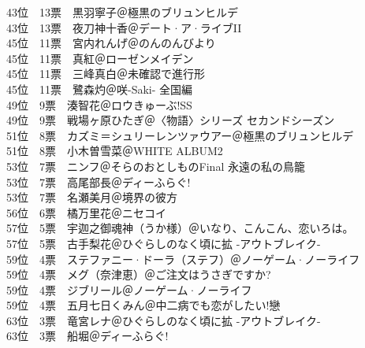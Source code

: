 {    43位　13票　黒羽寧子＠極黒のブリュンヒルデ                              \\
    43位　13票　夜刀神十香＠デート·ア·ライブII                            \\
    45位　11票　宮内れんげ＠のんのんびより                                  \\
    45位　11票　真紅＠ローゼンメイデン                                      \\
    45位　11票　三峰真白＠未確認で進行形                                    \\
    45位　11票　鷺森灼＠咲-Saki- 全国編                                     \\
    49位　9票　湊智花＠ロウきゅーぶ!SS                                      \\
    49位　9票　戦場ヶ原ひたぎ＠〈物語〉シリーズ セカンドシーズン            \\
    51位　8票　カズミ＝シュリーレンツァウアー＠極黒のブリュンヒルデ         \\
    51位　8票　小木曽雪菜＠WHITE ALBUM2                                     \\
    53位　7票　ニンフ＠そらのおとしものFinal 永遠の私の鳥籠                 \\
    53位　7票　高尾部長＠ディーふらぐ!                                      \\
    53位　7票　名瀬美月＠境界の彼方                                         \\
    56位　6票　橘万里花＠ニセコイ                                           \\
    57位　5票　宇迦之御魂神（うか様）＠いなり、こんこん、恋いろは。         \\
    57位　5票　古手梨花＠ひぐらしのなく頃に拡 -アウトブレイク-              \\
    59位　4票　ステファニー·ドーラ（ステフ）＠ノーゲーム·ノーライフ       \\
    59位　4票　メグ（奈津恵）＠ご注文はうさぎですか?                        \\
    59位　4票　ジブリール＠ノーゲーム·ノーライフ                           \\
    59位　4票　五月七日くみん＠中二病でも恋がしたい!戀                      \\
    63位　3票　竜宮レナ＠ひぐらしのなく頃に拡 -アウトブレイク-              \\
    63位　3票　船堀＠ディーふらぐ!                                          \\
}
